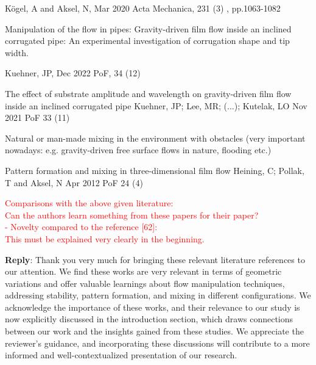 \documentclass[onecolumn,a4paper,amsmath,amssym,pre]{revtex4}
\begin{document}
\begin{enumerate}
\begin{enumerate}
{							Kögel, A and Aksel, N,
							Mar 2020 Acta Mechanica,
							231 (3) , pp.1063-1082
							
							\item Manipulation of the flow in pipes:
							Gravity-driven film flow inside an inclined corrugated pipe: An experimental investigation of corrugation shape and tip width.
							
							Kuehner, JP, Dec 2022 PoF, 34 (12)
							
							\item The effect of substrate amplitude and wavelength on gravity-driven film flow inside an inclined corrugated pipe
							Kuehner, JP; Lee, MR; (...); Kutelak, LO
							Nov 2021 PoF
							33 (11)
							
							\item Natural or man-made mixing in the environment with obstacles (very important nowadays: e.g. gravity-driven free surface flows in nature, flooding etc.)
							
							Pattern formation and mixing in three-dimensional film flow
							Heining, C; Pollak, T and Aksel, N
							Apr 2012 PoF
							24 (4)}
						
					\end{enumerate}
					
					\textcolor{red}{Comparisons with the above given literature:\\	
						Can the authors learn something from these papers for their paper?\\
						- Novelty compared to the reference [62]:\\
						This must be explained very clearly in the beginning.}
					
					\textbf{Reply}:
					Thank you very much for bringing these relevant literature references to our attention. We find these works are very relevant in terms of geometric variations and offer valuable learnings about flow manipulation techniques, addressing stability, pattern formation, and mixing in different configurations. %
					We acknowledge the importance of these works, and their relevance to our study is now explicitly discussed in the introduction section, which draws connections between our work and the insights gained from these studies. We appreciate the reviewer's guidance, and incorporating these discussions will contribute to a more informed and well-contextualized presentation of our research.
					

\end{enumerate}
\end{document}
